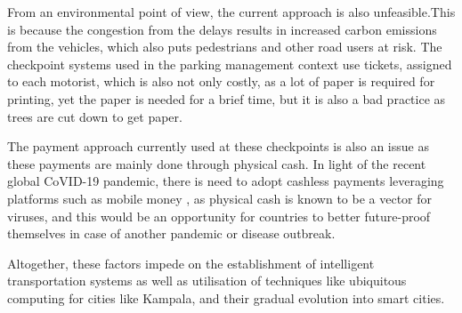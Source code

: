 From an environmental point of view, the current approach is also unfeasible.This is because the congestion from the delays results in increased carbon emissions from the vehicles, which also puts pedestrians and other road users at risk\cite{zhang_air_2013}. The checkpoint systems used in the parking management context use tickets, assigned to each motorist, which is also not only costly, as a lot of paper is required for printing, yet the paper is needed for a brief time, but it is also a bad practice as trees are cut down to get paper\cite{bajpai_basic_2015}.

The payment approach currently used at these checkpoints is also an issue as these payments are mainly done through physical cash. In light of the recent global CoVID-19 pandemic, there is need to adopt cashless payments leveraging platforms such as mobile money \cite{centellegher_mobile_2018}, as physical cash is known to be a vector for viruses,\cite{angelakis_paper_2014, maritz_filthy_2017} and this would be an opportunity for countries to better future-proof themselves in case of another pandemic or disease outbreak.

Altogether, these factors impede on the establishment of intelligent transportation systems as well as utilisation of techniques like ubiquitous computing for cities like Kampala, and their gradual evolution into smart cities.